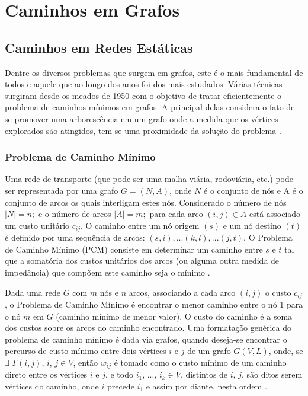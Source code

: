 \chapter{Caminhos em Grafos}

\section{Caminhos em Redes Estáticas}
Dentre os diversos problemas que surgem em grafos, este é o mais fundamental de todos e
aquele que ao longo dos anos foi dos mais estudados. Várias técnicas surgiram desde os meados
de 1950 com o objetivo de tratar eficientemente o problema de caminhos mínimos em grafos. A
principal delas considera o fato de se promover uma arborescência em um grafo onde a medida
que os vértices explorados são atingidos, tem-se uma proximidade da solução do problema \cite{negreirosbook}.

\subsection{Problema de Caminho Mínimo}
Uma rede de transporte (que pode ser uma malha viária, rodoviária, etc.) pode ser
representada por uma grafo $G = (N, A)$, onde $N$ é o conjunto de nós e A é o conjunto de arcos
os quais interligam estes nós. Considerado o número de nós $|N| = n;$ e o número de arcos $|A| = m;$ para
cada arco $(i, j) \in A$ está associado um custo unitário $c_{ij}$. O caminho entre um
nó origem $(s)$ e um nó destino $(t)$ é definido por uma sequência de
arcos: $(s,i),...(k,l),...(j,t)$. O Problema de Caminho Mínimo (PCM) consiste em determinar
um caminho entre $s$ e $t$ tal que a somatória dos custos unitários dos arcos (ou alguma
outra medida de impedância) que compõem este caminho seja o mínimo \cite{cunha}.

Dada uma rede $G$ com $m$ nós e $n$ arcos, associando a cada arco $(i,j)$ o custo $c_{ij}$, o Problema
de Caminho Mínimo é encontrar o menor caminho entre o nó 1 para o nó $m$ em $G$ (caminho mínimo de menor valor).
O custo do caminho é a soma dos custos sobre os arcos do caminho encontrado. Uma formatação genérica do problema
de caminho mínimo é dada via grafos, quando deseja-se encontrar o percurso de custo mínimo entre dois vértices $i$ e $j$
de um grafo $G(V,L)$, onde, se $\exists$ $\Gamma (i,j)$, $i$, $j \in V$, então $w_{ij}$ é tomado como o custo mínimo
de um caminho direto entre os vértices $i$ e $j$, e todo $i_1$, ..., $i_k \in V$, distintos de $i$, $j$, são ditos
serem vértices do caminho, onde $i$ precede $i_1$ e assim por diante, nesta ordem \cite{negreirosbook}.

